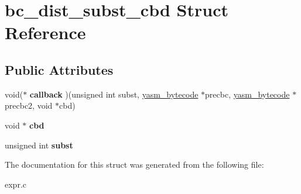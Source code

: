 \hypertarget{structbc__dist__subst__cbd}{\section{bc\-\_\-dist\-\_\-subst\-\_\-cbd Struct Reference}
\label{structbc__dist__subst__cbd}
}
\subsection*{Public Attributes}
\begin{DoxyCompactItemize}
\item 
\hypertarget{structbc__dist__subst__cbd_aad19ca2a0cb032328b282ca1c7e30c43}{void($\ast$ {\bfseries callback} )(unsigned int subst, \hyperlink{structyasm__bytecode}{yasm\-\_\-bytecode} $\ast$precbc, \hyperlink{structyasm__bytecode}{yasm\-\_\-bytecode} $\ast$precbc2, void $\ast$cbd)}\label{structbc__dist__subst__cbd_aad19ca2a0cb032328b282ca1c7e30c43}

\item 
\hypertarget{structbc__dist__subst__cbd_a6e952ada55bdf8d762a031f11fca08bb}{void $\ast$ {\bfseries cbd}}\label{structbc__dist__subst__cbd_a6e952ada55bdf8d762a031f11fca08bb}

\item 
\hypertarget{structbc__dist__subst__cbd_ab6ab58b0c515c6f164a3048c3ccb03c6}{unsigned int {\bfseries subst}}\label{structbc__dist__subst__cbd_ab6ab58b0c515c6f164a3048c3ccb03c6}

\end{DoxyCompactItemize}


The documentation for this struct was generated from the following file\-:\begin{DoxyCompactItemize}
\item 
expr.\-c\end{DoxyCompactItemize}
